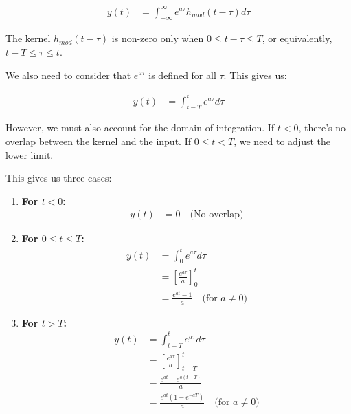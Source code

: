 \documentclass[12pt,a4paper,titlepage]{article}
\begin{document}
\begin{align}
y(t) &= \int_{-\infty}^{\infty} e^{a\tau}h_{mod}(t-\tau)d\tau
\end{align}

The kernel $h_{mod}(t-\tau)$ is non-zero only when $0 \leq t-\tau \leq T$, or equivalently, $t-T \leq \tau \leq t$.

We also need to consider that $e^{a\tau}$ is defined for all $\tau$. This gives us:

\begin{align}
y(t) &= \int_{t-T}^{t} e^{a\tau}d\tau
\end{align}

However, we must also account for the domain of integration. If $t < 0$, there's no overlap between the kernel and the input. If $0 \leq t < T$, we need to adjust the lower limit.

This gives us three cases:

\begin{enumerate}
    \item \textbf{For $t < 0$:}
    \begin{align}
        y(t) &= 0 \quad \text{(No overlap)}
    \end{align}
    
    \item \textbf{For $0 \leq t \leq T$:}
    \begin{align}
        y(t) &= \int_{0}^{t} e^{a\tau}d\tau \\
        &= \left[ \frac{e^{a\tau}}{a} \right]_{0}^{t} \\
        &= \frac{e^{at} - 1}{a} \quad \text{(for $a \neq 0$)}
    \end{align}
    
    \item \textbf{For $t > T$:}
    \begin{align}
        y(t) &= \int_{t-T}^{t} e^{a\tau}d\tau \\
        &= \left[ \frac{e^{a\tau}}{a} \right]_{t-T}^{t} \\
        &= \frac{e^{at} - e^{a(t-T)}}{a} \\
        &= \frac{e^{at}(1 - e^{-aT})}{a} \quad \text{(for $a \neq 0$)}
    \end{align}
\end{enumerate}
\end{document}
